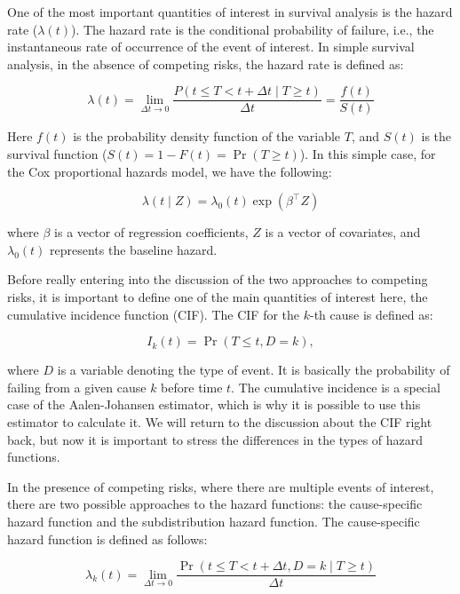 \documentclass[12pt]{article}
\begin{document}
One of the most important quantities of interest in survival analysis is the hazard rate ($\lambda(t)$). The hazard rate is the conditional probability of failure, i.e., the instantaneous rate of occurrence of the event of interest. In simple survival analysis, in the absence of competing risks, the hazard rate is defined as: 

\begin{equation}
\lambda(t) = \lim_{\Delta t \to 0} \frac{P(t \leq T < t + \Delta t \mid T \geq t)}{\Delta t} = \frac{f(t)}{S(t)}
\end{equation}

Here $f(t)$ is the probability density function of the variable $T$, and $S(t)$ is the survival function ($S(t) = 1 - F(t) = \Pr(T \geq t)$). In this simple case, for the Cox proportional hazards model, we have the following:


\begin{equation}
\lambda(t \mid Z) = \lambda_0(t) \exp(\beta^\top Z)
\end{equation}

where \(\beta\) is a vector of regression coefficients, \(Z\) is a vector of covariates, and \(\lambda_0(t)\) represents the baseline hazard.

Before really entering into the discussion of the two approaches to competing risks, it is important to define one of the main quantities of interest here, the cumulative incidence function (CIF). The CIF for the \(k\)-th cause is defined as:

\begin{equation}
I_k(t) = \Pr(T \leq t, D = k),
\end{equation}

where \(D\) is a variable denoting the type of event. It is basically the probability of failing from a given cause \(k\) before time \(t\). The cumulative incidence is a special case of the Aalen-Johansen estimator, which is why it is possible to use this estimator to calculate it. We will return to the discussion about the CIF right back, but now it is important to stress the differences in the types of hazard functions. 

In the presence of competing risks, where there are multiple events of interest, there are two possible approaches to the hazard functions: the cause-specific hazard function and the subdistribution hazard function. The cause-specific hazard function is defined as follows:

\begin{equation}
\lambda_k(t) = \lim_{\Delta t \to 0} \frac{\Pr(t \leq T < t + \Delta t, D = k \mid T \geq t)}{\Delta t}
\end{equation}
\end{document}
